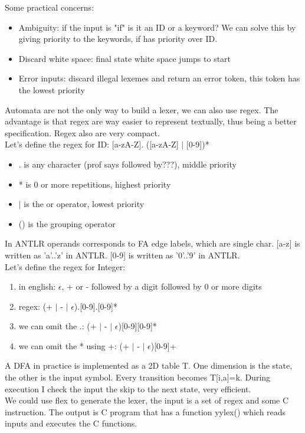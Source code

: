 \documentclass[12pt]{article}
\begin{document}
Some practical concerns: 
\begin{itemize}
    \item Ambiguity: if the input is "if" is it an ID or a keyword? We can solve this by giving priority to the keywords, if has priority over ID.
    \item Discard white space: final state white space jumps to start
    \item Error inputs: discard illegal lexemes and return an error token, this token has the lowest priority
\end{itemize}
Automata are not the only way to build a lexer, we can also use regex.
The advantage is that regex are way easier to represent textually, thus being a better specification. 
Regex also are very compact.
\\ Let's define the regex for ID:
[a-zA-Z]. ([a-zA-Z] $|$ [0-9])*
\begin{itemize}
    \item . is any character (prof says followed by???), middle priority
    \item * is 0 or more repetitions, highest priority
    \item $|$ is the or operator, lowest priority
    \item () is the grouping operator
\end{itemize}
In ANTLR operands corresponds to FA edge labels, which are single char.
[a-z] is written as 'a'..'z' in ANTLR.
[0-9] is written as '0'..'9' in ANTLR.
\\ Let's define the regex for Integer:
\begin{enumerate}
    \item in english: $\epsilon$, + or - followed by a digit followed by 0 or more digits
    \item regex: (+ $|$ - $|$ $\epsilon$).[0-9].[0-9]*
    \item we can omit the .: (+ $|$ - $|$ $\epsilon$)[0-9][0-9]*
    \item we can omit the * using +: (+ $|$ - $|$ $\epsilon$)[0-9]+
\end{enumerate}
A DFA in practice is implemented as a 2D table T. 
One dimension is the state, the other is the input symbol. Every transition becomes T[i,a]=k. During execution I check the input the skip to the next state, very efficient.
\\ 
We could use flex to generate the lexer, the input is a set of regex and some C instruction. The output is C program that has a function yylex() which reads inputs and executes the C functions.
\end{document}
